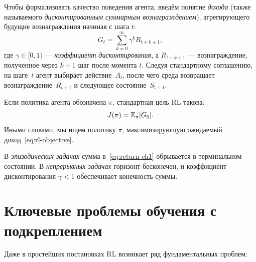 Чтобы формализовать качество поведения агента, введём понятие \emph{дохода} (также называемого \emph{дисконтированным суммарным вознаграждением}), агрегирующего будущие вознаграждения начиная с шага $t$:
\begin{equation}
\label{eq:return-ch1}
G_t = \sum_{k=0}^{\infty}\gamma^k R_{t+k+1},
\end{equation}
где $\gamma\in[0,1)$ — \emph{коэффициент дисконтирования}, а $R_{t+k+1}$ — вознаграждение, полученное через $k+1$ шаг после момента $t$.  Следуя стандартному соглашению, на шаге~$t$ агент выбирает действие~$A_t$, после чего среда возвращает вознаграждение~$R_{t+1}$ и следующее состояние~$S_{t+1}$.

Если политика агента обозначена $\pi$, стандартная цель RL такова:
\begin{equation}
\label{eq:rl-objective}
J(\pi)=\operatorname{\mathbb{E}}_{\pi}[G_0].
\end{equation}
Иными словами, мы ищем политику $\pi$, максимизирующую ожидаемый доход~\eqref{eq:rl-objective}.

\begin{remark}
\label{rem:episodic-continuing}
В \emph{эпизодических задачах} сумма в~\eqref{eq:return-ch1} обрывается в терминальном состоянии.  В \emph{непрерывных задачах} горизонт бесконечен, и коэффициент дисконтирования $\gamma<1$ обеспечивает конечность суммы.
\end{remark}


\section{Ключевые проблемы обучения с подкреплением}
\label{sec:rl-challenges}

Даже в простейших постановках RL возникает ряд фундаментальных проблем:

